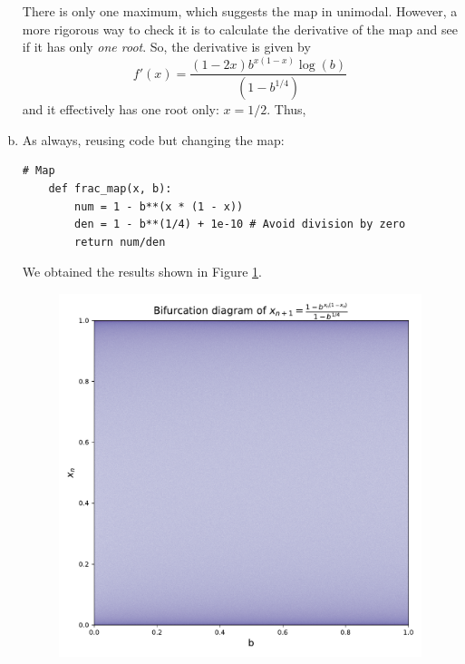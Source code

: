 \begin{enumerate}[(a)]
    There is only one maximum, which suggests the map in unimodal. However, a more rigorous way to
    check it is to calculate the derivative of the map and see if it has only \textit{one root}. So, the
    derivative is given by
    \[
    f'(x) = \frac{(1-2x)b^{x(1-x)}\log(b)}{(1-b^{1/4})}
    \]
    and it effectively has one root only: $x = 1/2$. Thus, 

    \item As always, reusing code but changing the map:
    \begin{lstlisting}[style=pythonstyle]
    # Map
    def frac_map(x, b):
        num = 1 - b**(x * (1 - x))
        den = 1 - b**(1/4) + 1e-10 # Avoid division by zero
        return num/den
    \end{lstlisting}
    We obtained the results shown in Figure \ref{fig:3b}.
    \begin{figure}[!ht]
        \centering
        \includegraphics[scale=0.65]{images/b_power.pdf}
        \label{fig:3b}
    \end{figure}


\end{enumerate}
